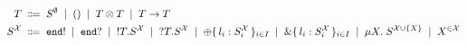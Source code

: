 \begin{align*}
  T \grmdef&
    S^\emptyset               \grmor
    \TUnit          \grmor
    \TPair T T      \grmor
    \TFun  T T      \\
  S^{\mathcal X} \grmdef&
    \TEnd !         \grmor
    \TEnd ?         \grmor
    \TOut T S^{\mathcal X}       \grmor
    \TIn  T S^{\mathcal X}       \grmor
    \TSelect{ l_i: S^{\mathcal X}_i } \grmor
    \TCase{ l_i: S^{\mathcal X}_i }   \grmor
    \TRec[X] S^{\mathcal X \cup \{X\}}      \grmor
    X^{\in \mathcal X}
\end{align*}

